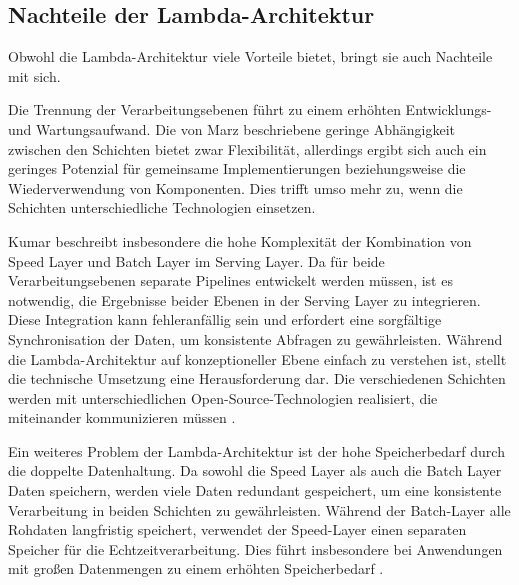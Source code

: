 \subsection{Nachteile der Lambda-Architektur}
Obwohl die Lambda-Architektur viele Vorteile bietet, bringt sie auch Nachteile mit sich. 

Die Trennung der Verarbeitungsebenen führt zu einem erhöhten Entwicklungs- und Wartungsaufwand. 
Die von Marz \cite{warren2015big} beschriebene geringe Abhängigkeit zwischen den Schichten bietet zwar Flexibilität, 
allerdings ergibt sich auch ein geringes Potenzial für gemeinsame Implementierungen beziehungsweise die Wiederverwendung von Komponenten.
Dies trifft umso mehr zu, wenn die Schichten unterschiedliche Technologien einsetzen.

Kumar \cite{kumar2020lambda} beschreibt insbesondere die hohe Komplexität der Kombination von Speed Layer und Batch Layer im Serving Layer. Da für beide Verarbeitungsebenen separate Pipelines entwickelt werden müssen, ist es notwendig, die Ergebnisse beider Ebenen in der Serving Layer zu integrieren. Diese Integration kann fehleranfällig sein und erfordert eine sorgfältige Synchronisation der Daten, um konsistente Abfragen zu gewährleisten. Während die Lambda-Architektur auf konzeptioneller Ebene einfach zu verstehen ist, stellt die technische Umsetzung eine Herausforderung dar. Die verschiedenen Schichten werden mit unterschiedlichen Open-Source-Technologien realisiert, die miteinander kommunizieren müssen \cite{katkar2015study}.

Ein weiteres Problem der Lambda-Architektur ist der hohe Speicherbedarf durch die doppelte Datenhaltung. Da sowohl die Speed Layer als auch die Batch Layer Daten speichern, werden viele Daten redundant gespeichert, um eine konsistente Verarbeitung in beiden Schichten zu gewährleisten. Während der Batch-Layer alle Rohdaten langfristig speichert, verwendet der Speed-Layer einen separaten Speicher für die Echtzeitverarbeitung. Dies führt insbesondere bei Anwendungen mit großen Datenmengen zu einem erhöhten Speicherbedarf \cite{kumar2020lambda}.